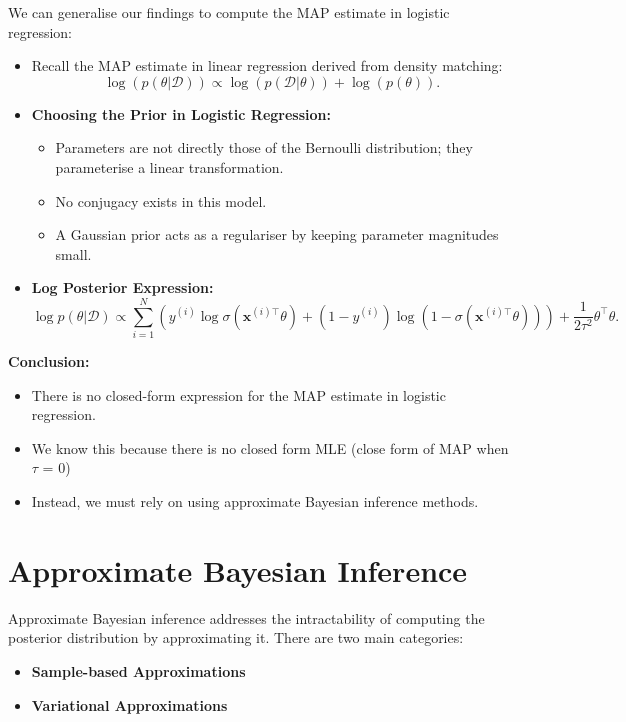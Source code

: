 We can generalise our findings to compute the MAP estimate in logistic regression:
\begin{itemize}
    \item Recall the MAP estimate in linear regression derived from density matching:
    \[
    \log(p(\theta|\mathcal{D})) \propto \log(p(\mathcal{D}|\theta)) + \log(p(\theta)).
    \]
    \item \textbf{Choosing the Prior in Logistic Regression:}
    \begin{itemize}
        \item Parameters are not directly those of the Bernoulli distribution; they parameterise a linear transformation.
        \item No conjugacy exists in this model.
        \item A Gaussian prior acts as a regulariser by keeping parameter magnitudes small.
    \end{itemize}
    \item \textbf{Log Posterior Expression:}
    \[
    \log p(\theta|\mathcal{D}) \propto \sum_{i=1}^N \left( y^{(i)} \log \sigma(\mathbf{x}^{(i)\top}\theta) + (1 - y^{(i)}) \log \left(1 - \sigma(\mathbf{x}^{(i)\top}\theta)\right) \right) + \frac{1}{2\tau^2} \theta^\top \theta.
    \]
\end{itemize}

\textbf{Conclusion:}
\begin{itemize}
    \item There is no closed-form expression for the MAP estimate in logistic regression.
    \item We know this because there is no closed form MLE (close form of MAP when $\tau$ = 0)
    \item Instead, we must rely on using approximate Bayesian inference methods.
\end{itemize}


\section{Approximate Bayesian Inference}

Approximate Bayesian inference addresses the intractability of computing the posterior distribution by approximating it. There are two main categories:

\begin{itemize}
    \item \textbf{Sample-based Approximations}
    \item \textbf{Variational Approximations}
\end{itemize}

